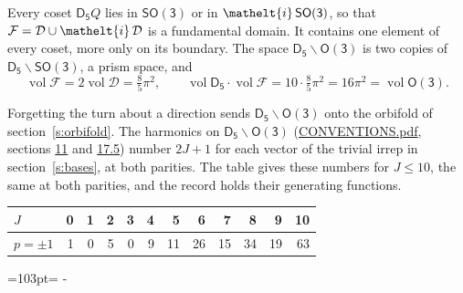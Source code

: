 \documentclass[10pt,a4paper]{article}
\newcommand{\needspace}[1]{\par\penalty-100\begingroup\dimen0=#1\relax\dimen2=\pagegoal
  \advance\dimen2-\pagetotal\ifdim\dimen0>\dimen2\relax\ifdim\dimen2>0pt\vfil\break\fi\fi
  \endgroup}
\numberwithin{equation}{section}
\newcommand{\eltfont}[1]{{\let\sigma\eltsigma\mathelt{#1}}}
\newcommand{\grp}[1]{\mathsf{#1}}
\newcommand{\elt}[1]{\eltfont{#1}}
\newcommand{\vol}{\operatorname{vol}}
\newcommand{\fcell}{\mathcal{D}}
\newcommand{\fdomain}{\mathcal{F}}
\begin{document}
\leavevmode\label{n:set.fundamental}Every coset $\grp{D_{5}}Q$ lies in \href{SO3.pdf}{$\grp{SO(3)}$} or in $\elt{i}\,\grp{SO(3)}$, so that $\fdomain = \fcell \cup \elt{i}\,\fcell$ is a fundamental domain. It contains one element of every coset, more only on its boundary.
The space $\grp{D_{5}}\backslash\grp{O(3)}$ is two copies of $\grp{D_{5}}\backslash\grp{SO(3)}$, a prism space, and
\begin{equation}\label{e:volume}\vol\fdomain = 2\vol\fcell = \tfrac{8}{5}\pi^2,\qquad \vol\grp{D_{5}}\cdot\vol\fdomain = 10\cdot \tfrac{8}{5}\pi^2 = 16\pi^2 = \vol\grp{O(3)}.\end{equation}

Forgetting the turn about a direction sends $\grp{D_{5}}\backslash\grp{O(3)}$ onto the orbifold of section~\ref{s:orbifold}.
The harmonics on $\grp{D_{5}}\backslash\grp{O(3)}$ (\href{../../CONVENTIONS.pdf}{CONVENTIONS.pdf}, sections \href{../../CONVENTIONS.pdf\#conv.11}{11} and \href{../../CONVENTIONS.pdf\#conv.17.5}{17.5}) number $2J + 1$ for each vector of the trivial irrep in section~\ref{s:bases}, at both parities. The table gives these numbers for $J \le 10$, the same at both parities, and the record holds their generating functions.
{\small\setlength{\tabcolsep}{4pt}\begin{longtable}{@{}lrrrrrrrrrrr@{}}\toprule
$J$ & 0 & 1 & 2 & 3 & 4 & 5 & 6 & 7 & 8 & 9 & 10\\\midrule\endhead
\bottomrule\endfoot\endlastfoot
$p = \pm 1$ & 1 & 0 & 5 & 0 & 9 & 11 & 26 & 15 & 34 & 19 & 63\\
\bottomrule\end{longtable}}
\needspace{103pt}
\end{document}
